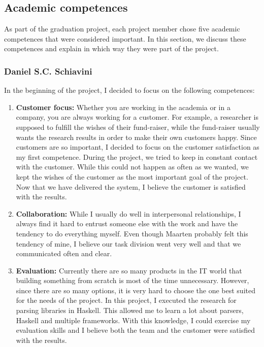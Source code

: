 
\subsection{Academic competences}
\label{assessment:competences}
As part of the graduation project, each project member chose five academic competences that were considered important.
In this section, we discuss these competences and explain in which way they were part of the project.

\subsubsection{Daniel S.C. Schiavini}
In the beginning of the project, I decided to focus on the following competences:
\begin{enumerate}
    \item \textbf{Customer focus:}
        Whether you are working in the academia or in a company, you are always working for a customer.
        For example, a researcher is supposed to fulfill the wishes of their fund-raiser, while the fund-raiser usually wants the research results in order to make their own customers happy.
        Since customers are so important, I decided to focus on the customer satisfaction as my first competence.
        During the project, we tried to keep in constant contact with the customer.
        While this could not happen as often as we wanted, we kept the wishes of the customer as the most important goal of the project.
        Now that we have delivered the system, I believe the customer is satisfied with the results.
        
    \item \textbf{Collaboration:}
        While I usually do well in interpersonal relationships, I always find it hard to entrust someone else with the work and have the tendency to do everything myself.
        Even though Maarten probably felt this tendency of mine, I believe our task division went very well and that we communicated often and clear.
    
    \item \textbf{Evaluation:}
        Currently there are so many products in the IT world that building something from scratch is most of the time unnecessary.
        However, since there are so many options, it is very hard to choose the one best suited for the needs of the project.
        In this project, I executed the research for parsing libraries in Haskell.
        This allowed me to learn a lot about parsers, Haskell and multiple frameworks.
        With this knowledge, I could exercise my evaluation skills and I believe both the team and the customer were satisfied with the results.
    

\end{enumerate}
